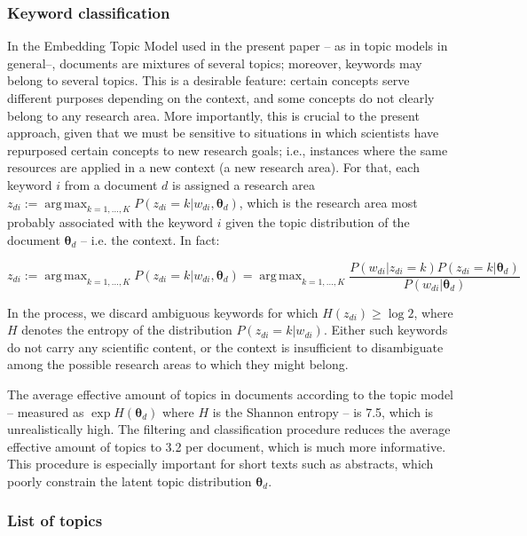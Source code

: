 \documentclass{article}
\DeclareMathOperator*{\argmax}{arg\,max}
\begin{document}
\subsubsection{\label{appendix:keywords}Keyword classification}

In the Embedding Topic Model used in the present paper -- as in topic models in general--, documents are mixtures of several topics; moreover, keywords may belong to several topics. This is a desirable feature: certain concepts serve different purposes depending on the context, and some concepts do not clearly belong to any research area. More importantly, this is crucial to the present approach, given that we must be sensitive to situations in which scientists have repurposed certain concepts to new research goals; i.e., instances where the same resources are applied in a new context (a new research area).
For that, each keyword $i$ from a document $d$ is assigned a research area $z_{di} := \argmax_{k=1,\dots,K} P(z_{di}=k|w_{di},\bm{\theta}_{d})$, which is the research area most probably associated with the keyword $i$ given the topic distribution of the document $\bm{\theta}_d$ -- i.e. the context. In fact:

\begin{equation}
    z_{di} := \argmax_{k=1,\dots,K} P(z_{di}=k|w_{di},\bm{\theta}_{d}) =  \argmax_{k=1,\dots,K} \dfrac{P(w_{di}|z_{di}=k)P(z_{di}=k|\bm{\theta}_d)}{P(w_{di}|\bm{\theta}_d)}
\end{equation}

In the process, we discard ambiguous keywords for which $H(z_{di})\geq \log{2}$, where $H$ denotes the entropy of the distribution $P(z_{di}=k|w_{di})$. Either such keywords do not carry any scientific content, or the context is insufficient to disambiguate among the possible research areas to which they might belong.

The average effective amount of topics in documents according to the topic model -- measured as $\exp H(\bm{\theta}_{d})$ where $H$ is the Shannon entropy -- is 7.5, which is unrealistically high. The filtering and classification procedure reduces the average effective amount of topics to 3.2 per document, which is much more informative. This procedure is especially important for short texts such as abstracts, which poorly constrain the latent topic distribution $\bm{\theta}_{d}$.

\subsubsection{List of topics}
\end{document}
